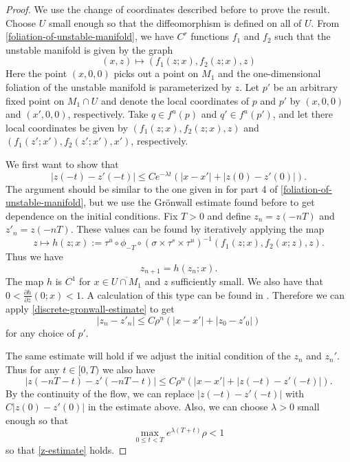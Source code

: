 \begin{proof}
	We use the change of coordinates described before to prove the result. Choose \(U\) small enough so that the diffeomorphism is defined on all of \(U\). From \cref{foliation-of-unstable-manifold}, we have \(C^r\) functions \(f_1\) and \(f_2\) such that the unstable manifold is given by the graph
	\begin{equation}
		(x,z) \mapsto (f_1(z; x),  f_2(z;x),  z)
	\end{equation}
	Here the point \((x,0,0)\) picks out a point on \( M_1\) and the one-dimensional foliation of the unstable manifold is parameterized by \(z\).
	Let \(p'\) be an arbitrary fixed point on \( M_1\cap U\) and denote the local coordinates of \(p\) and \(p'\) by \((x,0,0)\) and \((x',0,0)\), respectively. Take \(q \in f^u(p)\) and \(q' \in f^u(p')\), and let there local coordinates be given by \((f_1(z;x), f_2(z; x), z)\) and \((f_1(z';x') , f_2(z';x'), x')\), respectively. 
	
	We first want to show that 
	\begin{equation}\label{z-estimate}
		|z(-t) - z'(-t)| \leq C e^{-\lambda t} (|x- x'| + |z(0) - z'(0)|).
	\end{equation}
	The argument should be similar to the one given in \cite{wiggins1994normally} for part 4 of \cref{foliation-of-unstable-manifold}, but we use the Gr\"onwall estimate found before to get dependence on the initial conditions. Fix \(T>0\) and define \(z_n = z(-nT)\) and \(z'_{n} = z(-nT)\). These values can be found by iteratively applying the map
	\begin{equation}
		z \mapsto h(z;x) := \tau^u \circ \phi_{-T} \circ (\sigma \times \tau^s \times \tau^u)^{-1}(f_1(z;x), f_2(x;z), z).
	\end{equation}
	Thus we have 
	\begin{equation}
		z_{n+1} = h(z_{n}; x).
	\end{equation}
	The map \(h\) is \(C^1\) for \(x\in \overline {U\cap M_1}\) and \(z\) sufficiently small. We also have that \(0 < \frac{\partial h}{\partial z}(0;x) < 1\). A calculation of this type can be found in \cite{wiggins1994normally}. Therefore we can apply \cref{discrete-gronwall-estimate} to get 
	\begin{equation}
		|z_n - z'_n| \leq C \rho^n (|x-x'| + |z_0 - z'_0|)
	\end{equation}
	for any choice of \(p'\).
	
	The same estimate will hold if we adjust the initial condition of the \(z_n\) and \(z_n'\). Thus for any \(t\in [0,T)\) we also have
	\begin{equation}
		|z(-nT - t) - z'(-nT - t)| \leq C \rho^n (|x-x'| + |z(-t) - z'(-t)|).
	\end{equation}
	By the continuity of the flow, we can replace \(|z(-t) - z'(-t)|\) with \(C|z(0) - z'(0)|\) in the estimate above. Also, we can choose \(\lambda > 0\) small enough so that
	\begin{equation}
		\max_{0\leq t < T} e^{\lambda (T + t)} \rho < 1
	\end{equation}
	so that \cref{z-estimate} holds.
	

\end{proof}
